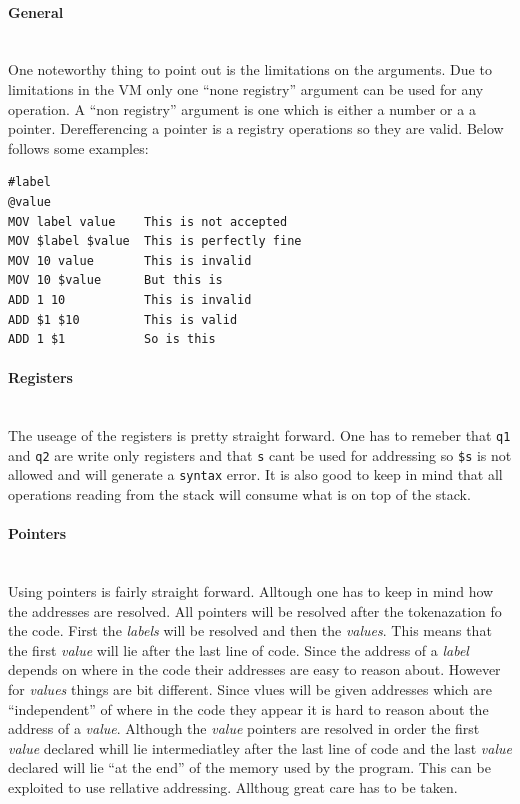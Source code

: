 \documentclass{article}
\newcommand{\V}{\verb}
\begin{document}
\paragraph{General} \ 
\\
One noteworthy thing to point out is the limitations on the arguments. Due to
limitations in the VM only one ``none registry'' argument can be used for any
operation. A ``non registry'' argument is one which is either a number or a
a pointer. Derefferencing a pointer is a registry operations so they are valid.
Below follows some examples:
\begin{verbatim}
#label
@value
MOV label value    This is not accepted
MOV $label $value  This is perfectly fine
MOV 10 value       This is invalid
MOV 10 $value      But this is
ADD 1 10           This is invalid
ADD $1 $10         This is valid
ADD 1 $1           So is this
\end{verbatim}

\paragraph{Registers} \ 
\\
The useage of the registers is pretty straight forward. One has to remeber that
\V+q1+ and \V+q2+ are write only registers and that \V+s+ cant be used for
addressing so \verb+$s+ is not allowed and will generate a \verb+syntax+ error.
It is also good to keep in mind that all operations reading from the stack will
consume what is on top of the stack.

\paragraph{Pointers} \
\\
Using pointers is fairly straight forward. Alltough one has to keep in mind how
the addresses are resolved. All pointers will be resolved after the
tokenazation fo the code. First the \emph{labels} will be resolved and then the
\emph{values}.
This means that the first \emph{value} will lie after the last line of code. Since the
address of a \emph{label} depends on where in the code their addresses are easy to
reason about. However for \emph{values} things are bit different. Since vlues
will be given addresses which are ``independent'' of where in the code they appear it is
hard to reason about the address of a \emph{value}. Although the \emph{value} pointers are
resolved in order the first \emph{value} declared whill lie intermediatley after the
last line of code and the last \emph{value} declared will lie ``at the end'' of the
memory used by the program. This can be exploited to use rellative addressing.
Allthoug great care has to be taken.
\end{document}
